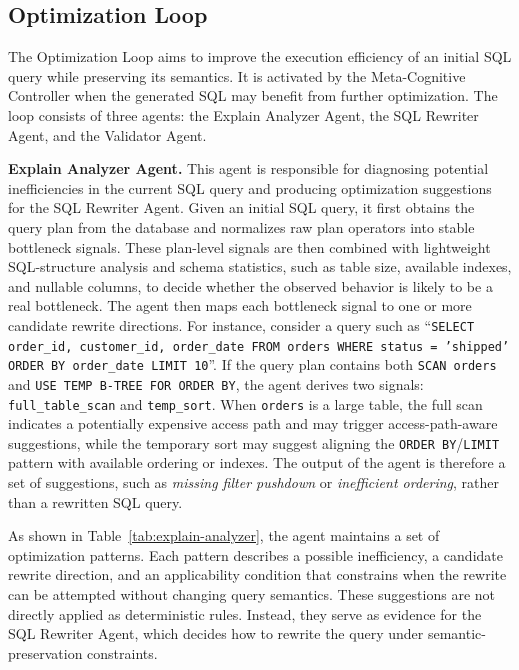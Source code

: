 \subsection{Optimization Loop}
\label{subsec: Optimization Loop}

The Optimization Loop aims to improve the execution efficiency of an initial SQL query while preserving its semantics.
It is activated by the Meta-Cognitive Controller when the generated SQL may benefit from further optimization.
The loop consists of three agents: the Explain Analyzer Agent, the SQL Rewriter Agent, and the Validator Agent.

\textbf{Explain Analyzer Agent.}
This agent is responsible for diagnosing potential inefficiencies in the current SQL query and producing optimization suggestions for the SQL Rewriter Agent.
Given an initial SQL query, it first obtains the query plan from the database and normalizes raw plan operators into stable bottleneck signals.
These plan-level signals are then combined with lightweight SQL-structure analysis and schema statistics, such as table size, available indexes, and nullable columns, to decide whether the observed behavior is likely to be a real bottleneck.
The agent then maps each bottleneck signal to one or more candidate rewrite directions.
For instance, consider a query such as ``\texttt{SELECT order\_id, customer\_id, order\_date FROM orders WHERE status = 'shipped' ORDER BY order\_date LIMIT 10}''.
If the query plan contains both \texttt{SCAN orders} and \texttt{USE TEMP B-TREE FOR ORDER BY}, the agent derives two signals: \texttt{full\_table\_scan} and \texttt{temp\_sort}.
When \texttt{orders} is a large table, the full scan indicates a potentially expensive access path and may trigger access-path-aware suggestions, while the temporary sort may suggest aligning the \texttt{ORDER BY}/\texttt{LIMIT} pattern with available ordering or indexes.
The output of the agent is therefore a set of suggestions, such as \textit{missing filter pushdown} or \textit{inefficient ordering}, rather than a rewritten SQL query.

As shown in Table~\ref{tab:explain-analyzer}, the agent maintains a set of optimization patterns.
Each pattern describes a possible inefficiency, a candidate rewrite direction, and an applicability condition that constrains when the rewrite can be attempted without changing query semantics.
These suggestions are not directly applied as deterministic rules.
Instead, they serve as evidence for the SQL Rewriter Agent, which decides how to rewrite the query under semantic-preservation constraints.


